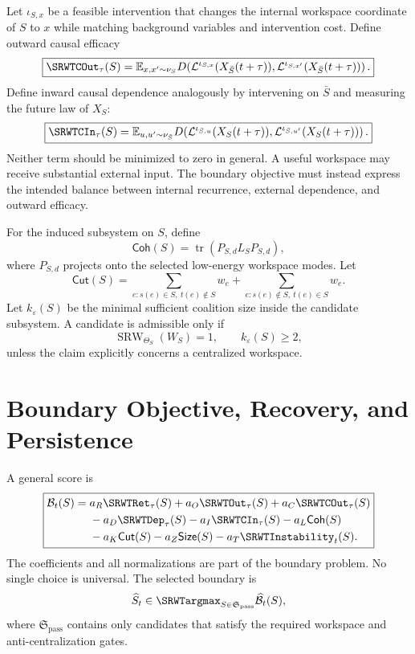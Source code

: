 Let \(\iota_{S,x}\) be a feasible intervention that changes the internal
workspace coordinate of \(S\) to \(x\) while matching background variables and
intervention cost. Define outward causal efficacy
\[
\boxed{
\SRWTCOut_\tau(S)
=
\mathbb E_{x,x'\sim\nu_S}
D\!\left(
\mathcal L^{\iota_{S,x}}
(X_{\bar S}(t+\tau)),
\mathcal L^{\iota_{S,x'}}
(X_{\bar S}(t+\tau))
\right).
}
\]
Define inward causal dependence analogously by intervening on \(\bar S\) and
measuring the future law of \(X_S\):
\[
\boxed{
\SRWTCIn_\tau(S)
=
\mathbb E_{u,u'\sim\nu_{\bar S}}
D\!\left(
\mathcal L^{\iota_{\bar S,u}}
(X_S(t+\tau)),
\mathcal L^{\iota_{\bar S,u'}}
(X_S(t+\tau))
\right).
}
\]
Neither term should be minimized to zero in general. A useful workspace may
receive substantial external input. The boundary objective must instead
express the intended balance between internal recurrence, external dependence,
and outward efficacy.


For the induced subsystem on \(S\), define
\[
\mathsf{Coh}(S)
=
\operatorname{tr}
\left(
P_{S,d}L_SP_{S,d}
\right),
\]
where \(P_{S,d}\) projects onto the selected low-energy workspace modes. Let
\[
\mathsf{Cut}(S)
=
\sum_{e:s(e)\in S,\ t(e)\notin S}w_e
+
\sum_{e:s(e)\notin S,\ t(e)\in S}w_e.
\]
Let \(k_\varepsilon(S)\) be the minimal sufficient coalition size inside the
candidate subsystem. A candidate is admissible only if
\[
\operatorname{SRW}_{\Theta_S}(W_S)=1,
\qquad
k_\varepsilon(S)\geq2,
\]
unless the claim explicitly concerns a centralized workspace.

\section{Boundary Objective, Recovery, and Persistence}

A general score is
\[
\boxed{
\begin{aligned}
\mathcal B_t(S)
={}&
 a_R\SRWTRet_\tau(S)
+a_O\SRWTOut_\tau(S)
+a_C\SRWTCOut_\tau(S)\\
&-a_D\SRWTDep_\tau(S)
-a_I\SRWTCIn_\tau(S)
-a_L\mathsf{Coh}(S)\\
&-a_K\mathsf{Cut}(S)
-a_Z\mathsf{Size}(S)
-a_T\SRWTInstability_t(S).
\end{aligned}
}
\]
The coefficients and all normalizations are part of the boundary problem. No
single choice is universal. The selected boundary is
\[
\widehat S_t
\in
\SRWTargmax_{S\in\mathfrak S_{\mathrm{pass}}}
\widehat{\mathcal B}_t(S),
\]
where \(\mathfrak S_{\mathrm{pass}}\) contains only candidates that satisfy the
required workspace and anti-centralization gates.


